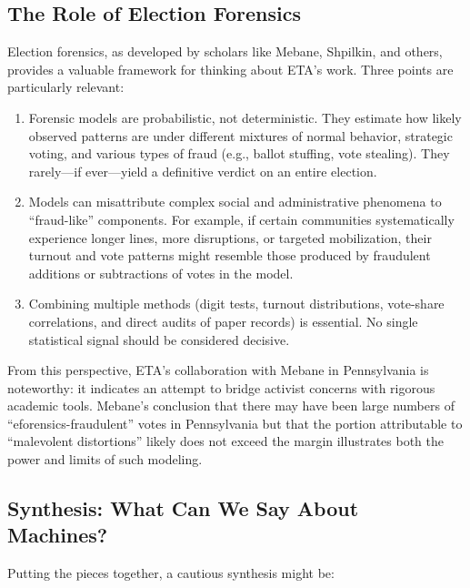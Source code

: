 \documentclass[12pt]{article}
\begin{document}
\subsection{The Role of Election Forensics}

Election forensics, as developed by scholars like Mebane, Shpilkin, and others, provides a valuable framework for thinking about ETA's work. Three points are particularly relevant:

\begin{enumerate}
    \item Forensic models are probabilistic, not deterministic. They estimate how likely observed patterns are under different mixtures of normal behavior, strategic voting, and various types of fraud (e.g., ballot stuffing, vote stealing). They rarely---if ever---yield a definitive verdict on an entire election.

    \item Models can misattribute complex social and administrative phenomena to \enquote{fraud-like} components. For example, if certain communities systematically experience longer lines, more disruptions, or targeted mobilization, their turnout and vote patterns might resemble those produced by fraudulent additions or subtractions of votes in the model.

    \item Combining multiple methods (digit tests, turnout distributions, vote-share correlations, and direct audits of paper records) is essential. No single statistical signal should be considered decisive.
\end{enumerate}

From this perspective, ETA's collaboration with Mebane in Pennsylvania is noteworthy: it indicates an attempt to bridge activist concerns with rigorous academic tools. Mebane's conclusion that there may have been large numbers of \enquote{eforensics-fraudulent} votes in Pennsylvania but that the portion attributable to \enquote{malevolent distortions} likely does not exceed the margin illustrates both the power and limits of such modeling.

\subsection{Synthesis: What Can We Say About Machines?}

Putting the pieces together, a cautious synthesis might be:
\end{document}
